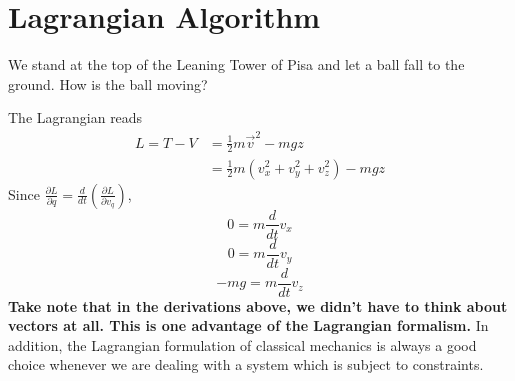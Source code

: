 \section{Lagrangian Algorithm}
\begin{mybox}
We stand at the top of the Leaning Tower of Pisa and let a ball fall to the ground. How is the ball moving?
\end{mybox}
The Lagrangian reads
$$
\begin{aligned}
L=T-V &=\frac{1}{2} m \vec{v}^{2}-m g z \\
&=\frac{1}{2} m\left(v_{x}^{2}+v_{y}^{2}+v_{z}^{2}\right)-m g z
\end{aligned}
$$
Since $\frac{\partial L}{\partial q}=\frac{d}{d t}\left(\frac{\partial L}{\partial v_{q}}\right)$,
$$
0=m \frac{d}{d t} v_{x}
$$
$$
0=m \frac{d}{d t} v_{y}
$$
$$
-m g=m \frac{d}{d t} v_{z}
$$
\textbf{Take note that in the derivations above, we didn’t have to think about vectors at all. This is one advantage of the Lagrangian formalism.} In addition, the Lagrangian formulation of classical mechanics is always a good choice whenever we are dealing with a system which is subject to constraints.

